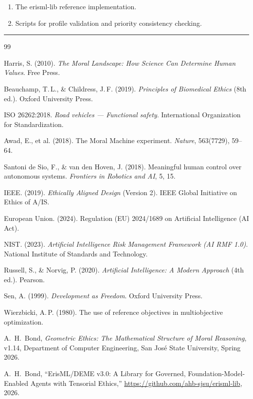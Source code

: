 \documentclass[11pt]{article}
\begin{document}
\begin{enumerate}
  \item The erisml-lib reference implementation.
  \item Scripts for profile validation and priority consistency checking.
\end{enumerate}

\hrule
\vspace{1em}

\begin{thebibliography}{99}

Harris, S. (2010). \emph{The Moral Landscape: How Science Can Determine Human Values}. Free Press.

Beauchamp, T.\,L., \& Childress, J.\,F. (2019). \emph{Principles of Biomedical Ethics} (8th ed.). Oxford University Press.

ISO 26262:2018. \emph{Road vehicles --- Functional safety}. International Organization for Standardization.

Awad, E., et al. (2018). The Moral Machine experiment. \emph{Nature}, 563(7729), 59--64.

Santoni de Sio, F., \& van den Hoven, J. (2018). Meaningful human control over autonomous systems. \emph{Frontiers in Robotics and AI}, 5, 15.

IEEE. (2019). \emph{Ethically Aligned Design} (Version 2). IEEE Global Initiative on Ethics of A/IS.

European Union. (2024). Regulation (EU) 2024/1689 on Artificial Intelligence (AI Act).

NIST. (2023). \emph{Artificial Intelligence Risk Management Framework (AI RMF 1.0)}. National Institute of Standards and Technology.

Russell, S., \& Norvig, P. (2020). \emph{Artificial Intelligence: A Modern Approach} (4th ed.). Pearson.

Sen, A. (1999). \emph{Development as Freedom}. Oxford University Press.

Wierzbicki, A.\,P. (1980). The use of reference objectives in multiobjective optimization.

A.~H.~Bond, \emph{Geometric Ethics: The Mathematical Structure of Moral Reasoning}, v1.14, Department of Computer Engineering, San Jos\'e State University, Spring 2026.

A.~H.~Bond, ``ErisML/DEME v3.0: A Library for Governed, Foundation-Model-Enabled Agents with Tensorial Ethics,'' \url{https://github.com/ahb-sjsu/erisml-lib}, 2026.

\end{thebibliography}
\end{document}

